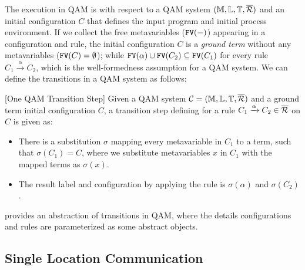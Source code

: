 The execution in QAM is with respect to a QAM system $(\mathbb{M},\mathbb{L},\mathbb{T},\overline{\mathcal{R}})$ and an initial configuration $C$ that defines the input program and initial process environment.
If we collect the free metavariables ($\texttt{FV}(-)$) appearing in a configuration and rule, 
the initial configuration $C$ is a \textit{ground term} without any metavariables ($\texttt{FV}(C)=\emptyset$);
while $\texttt{FV}(\alpha) \cup \texttt{FV}(C_2)\subseteq \texttt{FV}(C_1)$ for every rule $C_1 \xrightarrow{\alpha} C_2$, which is the well-formedness assumption for a QAM system.
We can define the transitions in a QAM system as follows:

\begin{definition}\label{def:labeledsystem}\rm[One QAM Transition Step]
Given a QAM system $\mathcal{C}=(\mathbb{M},\mathbb{L},\mathbb{T},\overline{\mathcal{R}})$ and a ground term initial configuration $C$, a transition step defining for a rule $C_1 \xrightarrow{\alpha} C_2 \in \overline{\mathcal{R}}$ on $C$ is given as:
\begin{itemize}
\item There is a substitution $\sigma$ mapping every metavariable in $C_1$ to a term, such that $\sigma(C_1)=C$, where we substitute metavariables $x$ in $C_1$ with the mapped terms as $\sigma(x)$.
\item The result label and configuration by applying the rule is $\sigma(\alpha)$ and $\sigma(C_2)$.
\end{itemize}
\end{definition}

 provides an abstraction of transitions in QAM, where the details configurations and rules are parameterized as some abstract objects.

\subsection{Single Location Communication} \label{sec:qamsyntax}


